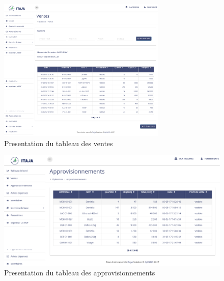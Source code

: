 \documentclass[xcolor=dvipsnames]{beamer}
\begin{document}
  \begin{frame}
  \begin{center}
  \begin{figure}[H]
  \includegraphics[scale=0.3, width=8cm]{images/qsales.png}
  \caption{Presentation du tableau des ventes}
  \end{figure} 
  \end{center}	
  \end{frame}
  
  \begin{frame}
  \begin{center}
  \begin{figure}[H]
  \includegraphics[scale=0.3, width=12cm]{images/qprocurements.png}
  \caption{Presentation du tableau des approvisionnements}
  \end{figure} 
  \end{center}	
  \end{frame}
  
\end{document}
